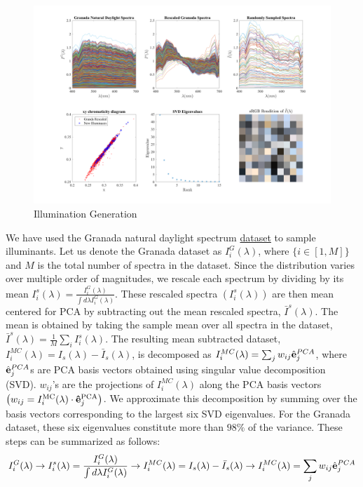 \documentclass{jov}
\begin{document}
\begin{figure}
\centering
	\includegraphics[width=\textwidth]{../Figures/Figure12/Figure12.pdf}
    \caption{Illumination Generation}
    \label{fig:illuminationGeneration}
\end{figure}
We have used the Granada natural daylight spectrum \href{http://colorimaginglab.ugr.es/pages/Data}{dataset} \cite{peyvandi2016colorimetric} to sample illuminants. Let us denote the Granada dataset as $I^G_i(\lambda)$, where $\{i \in [1,M]\}$ and $M$ is the total number of spectra in the dataset. Since the distribution varies over multiple order of magnitudes, we rescale each spectrum by dividing by its mean $I_i^s(\lambda) = \frac{I^G_i(\lambda)}{\int d\lambda I^G_i(\lambda)}$. These rescaled spectra $(I_i^s(\lambda))$ are then mean centered for PCA by subtracting out the mean 
rescaled spectra, $\bar{I}^{s}(\lambda)$. The mean is obtained
by taking the sample mean over all spectra in the dataset, $\bar{I}^{s}(\lambda) = \frac{1}{M}\sum_i{I_i^s(\lambda)}$. 
The resulting mean subtracted dataset, $I_i^{MC}(\lambda) = I_{s}(\lambda) - \bar{I}_{s}(\lambda)$, 
is decomposed as $I_i^{MC}(\lambda) = \sum_j w_{ij}\hat{{\bf e}}_j^{PCA}$, 
where $\hat{{\bf e}}_j^{PCA}$s are PCA basis vectors obtained using 
singular value decomposition (SVD). $w_{ij}$'s are the projections 
of $I_i^{MC}(\lambda)$ along the PCA basis vectors $\left( w_{ij} = I_i^{\rm MC}(\lambda)\cdot {\bf \hat{e}}_j^{\rm PCA}\right)$. We approximate 
this decomposition by summing over the basis vectors corresponding to
the largest six SVD eigenvalues. For the Granada dataset, these six 
eigenvalues constitute more than $98\%$ of the variance. These steps
can be summarized as follows:
\begin{align}
I^G_i(\lambda) \rightarrow I_i^s(\lambda) = \frac{I^G_i(\lambda)}{\int d\lambda I^G_i(\lambda)} \rightarrow I_i^{MC}(\lambda) = I_{s}(\lambda) - \bar{I}_{s}(\lambda) \rightarrow I_i^{MC}(\lambda) = \sum_j w_{ij}\hat{{\bf e}}_j^{PCA}
\end{align}
\end{document}
